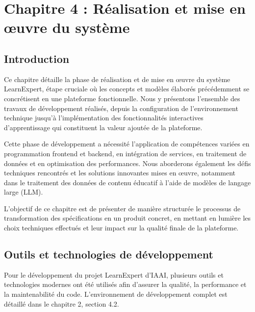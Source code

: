 \chapter*{Chapitre 4 : Réalisation et mise en œuvre du système}
\thispagestyle{fancy}
\setcounter{section}{0}
\newpage

\section{Introduction}

Ce chapitre détaille la phase de réalisation et de mise en œuvre du système LearnExpert, étape cruciale où les concepts et modèles élaborés précédemment se concrétisent en une plateforme fonctionnelle. Nous y présentons l'ensemble des travaux de développement réalisés, depuis la configuration de l'environnement technique jusqu'à l'implémentation des fonctionnalités interactives d'apprentissage qui constituent la valeur ajoutée de la plateforme.

Cette phase de développement a nécessité l'application de compétences variées en programmation frontend et backend, en intégration de services, en traitement de données et en optimisation des performances. Nous aborderons également les défis techniques rencontrés et les solutions innovantes mises en œuvre, notamment dans le traitement des données de contenu éducatif à l'aide de modèles de langage large (LLM).

L'objectif de ce chapitre est de présenter de manière structurée le processus de transformation des spécifications en un produit concret, en mettant en lumière les choix techniques effectués et leur impact sur la qualité finale de la plateforme.

\section{Outils et technologies de développement}
Pour le développement du projet LearnExpert d'IAAI, plusieurs outils et technologies modernes ont été utilisés afin d'assurer la qualité, la performance et la maintenabilité du code. L'environnement de développement complet est détaillé dans le chapitre 2, section 4.2.

